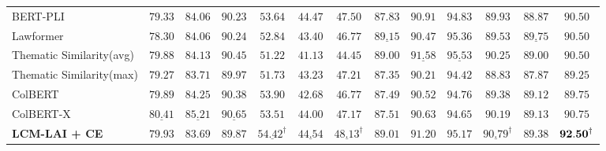 \begin{table*}[t]
{\begin{tabular}{lcccccccccccc}
 BERT-PLI           & $ 79.33 $     & $ 84.06 $     & $ 90.23 $     & $ 53.64 $     & $ 44.47 $      & $ 47.50 $ 
                    & $ 87.83 $     & $ 90.91 $     & $ 94.83 $     & $ 89.93 $     & $ 88.87 $      & $ 90.50 $     \\
                    
 Lawformer          & $ 78.30 $     & $ 84.06 $     & $ 90.24 $     & $ 52.84 $     & $ 43.40 $      & $ 46.77 $ 
                    & $ \underline{89.15} $     & $ 90.47 $     & $ 95.36 $     & $ 89.53 $     & $ \underline{89.75} $      & $ 90.50 $     \\

 Thematic Similarity(avg) 
                    & $ 79.88 $     & $ 84.13 $     & $ 90.45 $     & $ 51.22 $     & $ 41.13 $      & $ 44.45 $ 
                    & $ 89.00 $     & $ \underline{91.58} $     & $ \underline{95.53} $     & $ 90.25 $     & $ 89.00 $      & $ 90.50 $     \\

 Thematic Similarity(max) 
                    & $ 79.27 $     & $ 83.71 $     & $ 89.97 $     & $ 51.73 $     & $ 43.23 $      & $ 47.21 $ 
                    & $ 87.35 $     & $ 90.21 $     & $ 94.42 $     & $ 88.83 $     & $ 87.87 $      & $ 89.25 $     \\

 ColBERT 
                    & $ 79.89 $     & $ 84.25 $     & $ 90.38 $     & $ 53.90 $     & $ 42.68 $      & $ 46.77 $ 
                    & $ 87.49 $     & $ 90.52 $     & $ 94.76 $     & $ 89.38 $     & $ 89.12 $      & $ 89.75 $     \\

 ColBERT-X 
                    & $ \underline{80.41} $     & $ \underline{85.21} $     & $ \underline{90.65} $     & $ 53.51 $     & $ 44.00 $      & $ 47.17 $ 
                    & $ 87.51 $     & $ 90.63 $     & $ 94.65 $     & $ 90.19 $     & $ 89.13 $      & $ 90.75 $     \\
 
 \midrule

 \bf{LCM-LAI + CE}       
                & $ 79.93 $     & $ 83.69 $     & $ 89.87 $     & $ \underline {54.42^{\dagger}} $     & $ \underline {44.54} $      & $ \underline {48.13}^{\dagger} $ 
                & $ 89.01 $     & $ 91.20 $     & $ 95.17 $     & $ \underline{90.79}^{\dagger} $     & $ 89.38 $      & $ \bf{92.50}^{\dagger} $     \\


\end{tabular}}
\end{table*}
